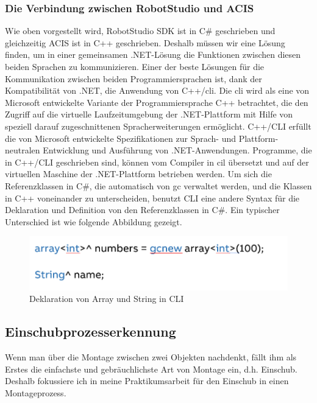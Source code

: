 \documentclass[14pt,a4paper,titlepage]{article}
\begin{document}
			\subsubsection{Die Verbindung zwischen RobotStudio und ACIS}
			Wie oben vorgestellt wird, RobotStudio SDK ist in C\# geschrieben und gleichzeitig ACIS ist in C++ geschrieben. Deshalb müssen wir eine Lösung finden, um in einer gemeinsamen .NET-Lösung die Funktionen zwischen diesen beiden Sprachen zu kommunizieren.
			\bigbreak
			Einer der beste Lösungen für die Kommunikation zwischen beiden Programmiersprachen ist, dank der Kompatibilität von .NET, die Anwendung von C++/\acs{cli}. Die \ac{cli} wird als eine von Microsoft entwickelte Variante der Programmiersprache C++ betrachtet, die den Zugriff auf die virtuelle Laufzeitumgebung der .NET-Plattform mit Hilfe von speziell darauf zugeschnittenen Spracherweiterungen ermöglicht.
			C++/CLI erfüllt die von Microsoft entwickelte Spezifikationen zur Sprach- und Plattform-neutralen Entwicklung und Ausführung von .NET-Anwendungen. Programme, die in C++/CLI geschrieben sind, können vom Compiler in \ac{cil} übersetzt und auf der virtuellen Maschine der .NET-Plattform betrieben werden\cite{cli}.
			\bigbreak
			Um sich die Referenzklassen in C\#, die automatisch von \ac{gc} verwaltet werden, und die Klassen in C++ voneinander zu unterscheiden, benutzt CLI eine andere Syntax für die Deklaration und Definition von den Referenzklassen in C\#. Ein typischer Unterschied ist wie folgende Abbildung gezeigt.
				\begin{figure}[h!]
				\centering
				\includegraphics[width=0.5\linewidth]{cli.png}
				\caption{Deklaration von Array und String in CLI}
				\end{figure}
		
		\subsection{Einschubprozesserkennung}
		Wenn man über die Montage zwischen zwei Objekten nachdenkt, fällt ihm als Erstes die einfachste und gebräuchlichste Art von Montage ein, d.h. Einschub. Deshalb fokussiere ich in meine Praktikumsarbeit für den Einschub in einen Montageprozess. 
\end{document}
